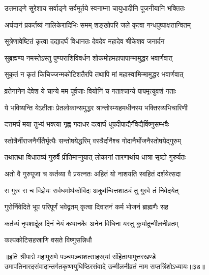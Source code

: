\twolineshloka
{उत्तमाङ्गे सुरेशाय सर्वाङ्गे सर्वमूर्तये}
{स्वनाम्ना चायुधादीनि पूजनीयानि भक्तितः}%

\twolineshloka
{अर्घदानं प्रकर्तव्यं नालिकेरादिभिः समम्}
{शङ्खोपरि जले कृत्वा गन्धपुष्पाक्षतान्वितम्}%

\twolineshloka
{सूत्रेणावेष्टितं कृत्वा दद्यादर्घं विधानतः}
{देवदेव महादेव श्रीकेशव जनार्दन}%

\twolineshloka
{सुब्रह्मण्य नमस्तेऽस्तु पुण्यराशिविवर्धन}
{शोकमोहमहापापान्मामुद्धर भवार्णवात्}%

\twolineshloka
{सुकृतं न कृतं किचिज्जन्मकोटिशतैरपि}
{तथापि मां महास्वामिन्मामुद्धर भवार्णवात्}%

\twolineshloka
{व्रतेनानेन देवेश ये चान्ये मम पूर्वजाः}
{वियोनिं च गताश्चान्ये पापमृत्युवशं गताः}%

\twolineshloka
{ये भविष्यन्ति येऽतीताः प्रेतलोकान्समुद्धर}
{श्रान्तोस्म्यहमधीनस्य भक्तिरव्यभिचारिणी}%

\twolineshloka
{दत्तमर्घं मया तुभ्यं भक्त्या गृह्ण गदाधर}
{दत्वार्घं धूपदीपाद्यैर्नैवेद्यैर्विष्णुसम्भवैः}%

\twolineshloka
{स्तोत्रैर्नीराजनैर्गीतैर्भृत्यैः सन्तोषयेद्धरिम्}
{वस्त्रैर्दानैश्च गोदानैर्भोजनैस्तोषयेद्गुरुम्}%

\twolineshloka
{तथातथा विधातव्यं गुरुर्वै प्रीतिमाप्नुयात्}
{लोकानां तारणार्थाय धात्रा सृष्टो गुरुर्यतः}%

\twolineshloka
{अतो वै गुरुपूजा च कर्तव्या वै प्रयत्नतः}
{अहितं यो नाशयति स्वहितं दर्शयेत्सदा}%

\twolineshloka
{स गुरुः स च विज्ञेयः सर्वधर्मार्थकोविदः}
{अकुर्वन्वित्तशाठ्यं तु गुरवे तं निवेदयेत्}%

\twolineshloka
{गुरोर्निवेदिते भूप परिपूर्णं भवेद्व्रतम्}
{कृत्वा दिवातनं कर्म भोजनं ब्राह्मणैः सह}%

\twolineshloka
{कर्तव्यं नृपशार्दूल दिनं नेयं कथानकैः}
{अनेन विधिना यस्तु कुर्यादुन्मीलनीव्रतम्}%

\onelineshloka
{कल्पकोटिसहस्राणि वसते विष्णुसन्निधौ}%

॥इति श्रीपाद्मे महापुराणे पञ्चपञ्चाशत्साहस्र्यां संहितायामुत्तरखण्डे उमापतिनारदसंवादान्तर्गतकृष्णयुधिष्ठिरसंवादे उन्मीलनीव्रतं नाम सप्तत्रिंशोऽध्यायः॥३७॥


\hyperref[sec:ekadashi_mahatmyam_padma_puranam]{\closesub}
\clearpage

\label{sec:padma-pakshavardhini}



